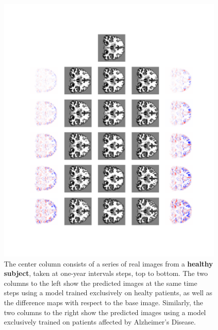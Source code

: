 \begin{figure}
	\centering
	\includegraphics[width=\linewidth, trim={100 100 66 30}, clip]{images/HC_AD_plots/comp_ADNI_137014}
	\vspace*{-15pt}
	\caption{The center column consists of a series of real images from a \textbf{healthy subject}, taken at one-year intervals steps, top to bottom. The two columns to the left show the predicted images at the same time steps using a model trained exclusively on healty patients, as well as the difference maps with respect to the base image. Similarly, the two columns to the right show the predicted images using a model exclusively trained on patients affected by Alzheimer's Disease.}
	\label{fig:hcad_hc} %
\end{figure}




